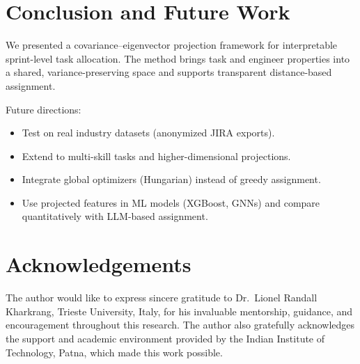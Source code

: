 \documentclass[journal]{IEEEtran}
\begin{document}
\section{Conclusion and Future Work}\label{sec:concl}
We presented a covariance--eigenvector projection framework for interpretable sprint-level task allocation. The method brings task and engineer properties into a shared, variance-preserving space and supports transparent distance-based assignment.

Future directions:
\begin{itemize}[leftmargin=*]
    \item Test on real industry datasets (anonymized JIRA exports).
    \item Extend to multi-skill tasks and higher-dimensional projections.
    \item Integrate global optimizers (Hungarian) instead of greedy assignment.
    \item Use projected features in ML models (XGBoost, GNNs) and compare quantitatively with LLM-based assignment.
\end{itemize}

\section*{Acknowledgements}
The author would like to express sincere gratitude to 
Dr.~Lionel Randall Kharkrang, Trieste University, Italy, 
for his invaluable mentorship, guidance, and encouragement throughout this research. 
The author also gratefully acknowledges the support and academic environment provided by the 
Indian Institute of Technology, Patna, which made this work possible.
\end{document}
